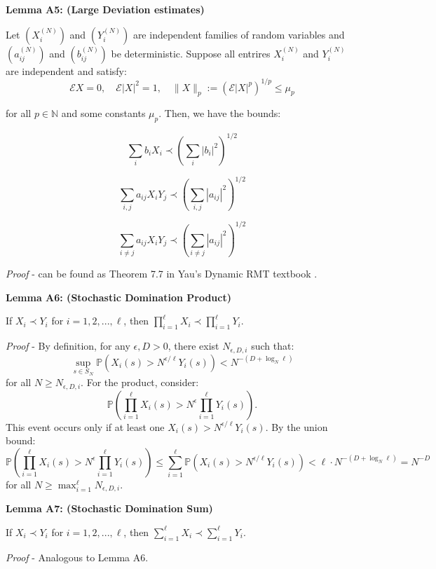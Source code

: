 \documentclass[11pt]{article}
\newenvironment{boxtheorem}[1]
  {\begin{mdframed}\noindent\textbf{#1}\itshape\space}
  {\end{mdframed}}
\newcommand{\E}{\mathcal{E}}
\newcommand{\N}{\mathbb{N}}
\begin{document}
  

\begin{boxtheorem}{Lemma A5: (Large Deviation estimates)}    \label{lemma-a5}

  

Let $\left(X_i^{(N)}\right)$ and $\left(Y_i^{(N)}\right)$ are independent families of random variables and $\left(a_{ij}^{(N)}\right)$ and $\left(b_{ij}^{(N)}\right)$ be deterministic. Suppose all entrires $X_{i}^{(N)}$ and $Y_{i}^{(N)}$ are independent and satisfy: $$\E X = 0, \quad \E |X|^2=1, \quad \|X\|_p:=(\E |X|^p)^{1/p}\leq \mu_p$$

for all $p\in \N$ and some constants $\mu_p$. Then, we have the bounds: 

\begin{equation*}\sum_i b_i X_i \prec \left(\sum_i |b_i|^2\right)^{1/2}\tag{1.1}\end{equation*}

\begin{equation*}\sum_{i, j} a_{ij}X_iY_j \prec \left(\sum_{i,j} |a_{ij}|^2\right)^{1/2}\tag{1.2}\end{equation*}

\begin{equation*}\sum_{i\neq j} a_{ij}X_iY_j \prec \left(\sum_{i\neq j} |a_{ij}|^2\right)^{1/2}\tag{1.3}\end{equation*}

\end{boxtheorem}
\textit{Proof} - can be found as Theorem 7.7 in Yau's Dynamic RMT textbook \cite{dynamic}. 


\begin{boxtheorem}{Lemma A6: (Stochastic Domination Product)}\label{lemma-a6}

If $X_i \prec Y_i$ for $i = 1,2,...,\ell$, then $\prod_{i=1}^{\ell} X_i \prec \prod_{i=1}^{\ell} Y_i$.
\end{boxtheorem}
\textit{Proof} - By definition, for any $\epsilon, D > 0$, there exist $N_{\epsilon,D,i}$ such that: $$\sup_{s\in S_N}\mathbb{P}\left(X_i(s) > N^{\epsilon/\ell} Y_i(s)\right) < N^{-(D+\log_N \ell)}$$ for all $N \geq N_{\epsilon,D,i}$. For the product, consider: $$\mathbb{P}\left(\prod_{i=1}^{\ell} X_i(s) > N^{\epsilon} \prod_{i=1}^{\ell} Y_i(s)\right).$$
This event occurs only if at least one $X_i(s) > N^{\epsilon/\ell} Y_i(s)$. By the union bound: $$\mathbb{P}\left(\prod_{i=1}^{\ell} X_i(s) > N^{\epsilon} \prod_{i=1}^{\ell} Y_i(s)\right) \leq \sum_{i=1}^{\ell} \mathbb{P}\left(X_i(s) > N^{\epsilon/\ell} Y_i(s)\right) < \ell \cdot N^{-(D+\log_N \ell)} = N^{-D}$$ for all $N \geq \max_{i=1}^{\ell} N_{\epsilon,D,i}$.
\begin{boxtheorem}{Lemma A7: (Stochastic Domination Sum)}\label{lemma-a7}

If $X_i \prec Y_i$ for $i = 1,2,...,\ell$, then $\sum_{i=1}^{\ell} X_i \prec \sum_{i=1}^{\ell} Y_i$.
\end{boxtheorem}
\textit{Proof} - Analogous to Lemma A6. 
\end{document}
